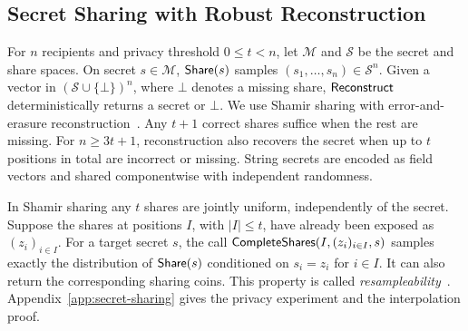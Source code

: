 \subsection{Secret Sharing with Robust Reconstruction}
\label{sec:secret-sharing}

For $n$ recipients and privacy threshold $0\le t<n$, let $\mathcal M$ and
$\mathcal S$ be the secret and share spaces.  On secret $s\in\mathcal M$,
$\mathsf{Share}(s)$ samples $(s_1,\ldots,s_n)\in\mathcal S^n$.
Given a vector in $(\mathcal S\cup\{\bot\})^n$, where $\bot$ denotes a
missing share, $\mathsf{Reconstruct}$ deterministically returns a secret or $\bot$.
We use Shamir sharing with error-and-erasure reconstruction~\cite{Shamir1979SecretSharing,McElieceSarwate1981SecretSharing}.
Any $t+1$ correct shares suffice when the rest are missing.  For
$n\geq3t+1$, reconstruction also recovers the secret when up to $t$
positions in total are incorrect or missing.  String secrets are encoded
as field vectors and shared componentwise with independent randomness.

In Shamir sharing any $t$ shares are jointly uniform, independently of
the secret. Suppose the shares at positions $I$, with $|I|\le t$, have
already been exposed as $(z_i)_{i\in I}$. For a target secret $s$, the call
$\mathsf{CompleteShares}(I,(z_i)_{i\in I},s)$ samples exactly the distribution
of $\mathsf{Share}(s)$ conditioned on $s_i=z_i$ for $i\in I$.
It can also return the corresponding sharing coins.
This property is called \emph{resampleability}~\cite[Definition~2.6 and Remark~2.2]{HazayEtAl2025Resampling}.
Appendix~\ref{app:secret-sharing} gives the privacy experiment and the
interpolation proof.
